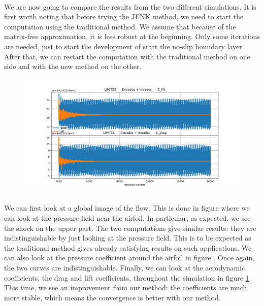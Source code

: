         \paragraph{}
        We are now going to compare the results from the two different simulations.
        It is first worth noting that before trying the JFNK method, we need to start the computation using the traditional method.
        We assume that because of the matrix-free approximation, it is less robust at the beginning.
        Only some iterations are needed, just to start the development of start the no-slip boundary layer.
        After that, we can restart the computation with the traditional method on one side and with the new method on the other.

        \begin{figure}
          \centering
          \includegraphics[width=\textwidth]{figures/rae_coefficients.png}
          \caption{}
          \label{fig:rae_coefficients}
        \end{figure}

        \paragraph{}
        We can first look at a global image of the flow.
        This is done in figure  where we can look at the pressure field near the airfoil.
        In particular, as expected, we see the shock on the upper part.
        The two computations give similar results: they are indistinguishable by just looking at the pressure field.
        This is to be expected as the traditional method gives already satisfying results on such applications.
        We can also look at the pressure coefficient around the airfoil in figure .
        Once again, the two curves are indistinguishable.
        Finally, we can look at the aerodynamic coefficients, the drag and lift coefficients, throughout the simulation in figure \ref{fig:rae_coefficients}.
        This time, we see an improvement from our method: the coefficients are much more stable, which means the convergence is better with our method.

